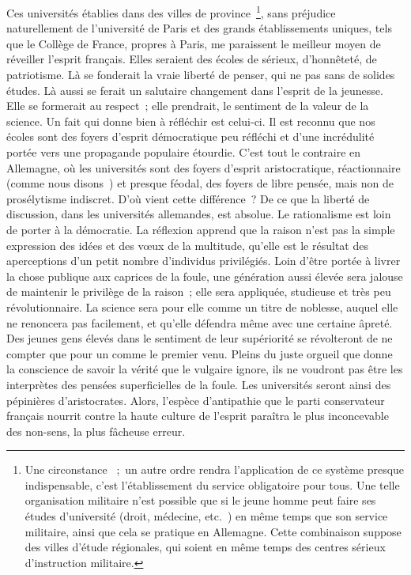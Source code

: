 \documentclass[french,twoside]{book} %
\begin{document}
Ces universités établies dans des villes de province \footnote{ Une circonstance  ; un autre ordre rendra l’application de ce système presque indispensable, c’est l’établissement du service obligatoire pour tous. Une telle organisation militaire n’est possible que si le jeune homme peut faire ses études d’université (droit, médecine, etc. ) en même temps que son service militaire, ainsi que cela se pratique en Allemagne. Cette combinaison suppose des villes d’étude régionales, qui soient en même temps des centres sérieux d’instruction militaire.}, sans préjudice naturellement de l’université de Paris et des grands établissements uniques, tels que le Collège de France, propres à Paris, me paraissent le meilleur moyen de réveiller l’esprit français. Elles seraient des écoles de sérieux, d’honnêteté, de patriotisme. Là se fonderait la vraie liberté de penser, qui ne pas sans de solides études. Là aussi se ferait un salutaire changement dans l’esprit de la jeunesse. Elle se formerait au respect ; elle prendrait, le sentiment de la valeur de la science. Un fait qui donne bien à réfléchir est celui-ci. Il est reconnu que nos écoles sont des foyers d’esprit démocratique peu réfléchi et d’une incrédulité portée vers une propagande populaire étourdie. C’est tout le contraire en Allemagne, où les universités sont des foyers d’esprit aristocratique, réactionnaire (comme nous disons ) et presque féodal, des foyers de libre pensée, mais non de prosélytisme indiscret. D’où vient cette différence ? De ce que la liberté de discussion, dans les universités allemandes, est absolue. Le rationalisme est loin de porter à la démocratie. La réflexion apprend que la raison n’est pas la simple expression des idées et des vœux de la multitude, qu’elle est le résultat des aperceptions d’un petit nombre d’individus privilégiés. Loin d’être portée à livrer la chose publique aux caprices de la foule, une génération aussi élevée sera jalouse de maintenir le privilège de la raison ; elle sera appliquée, studieuse et très peu révolutionnaire. La science sera pour elle comme un titre de noblesse, auquel elle ne renoncera pas facilement, et qu’elle défendra même avec une certaine âpreté. Des jeunes gens élevés dans le sentiment de leur supériorité se révolteront de ne compter que pour un comme le premier venu. Pleins du juste orgueil que donne la conscience de savoir la vérité que le vulgaire ignore, ils ne voudront pas être les interprètes des pensées superficielles de la foule. Les universités seront ainsi des pépinières d’aristocrates. Alors, l’espèce d’antipathie que le parti conservateur français nourrit contre la haute culture de l’esprit paraîtra le plus inconcevable des non-sens, la plus fâcheuse erreur.\par
\end{document}
